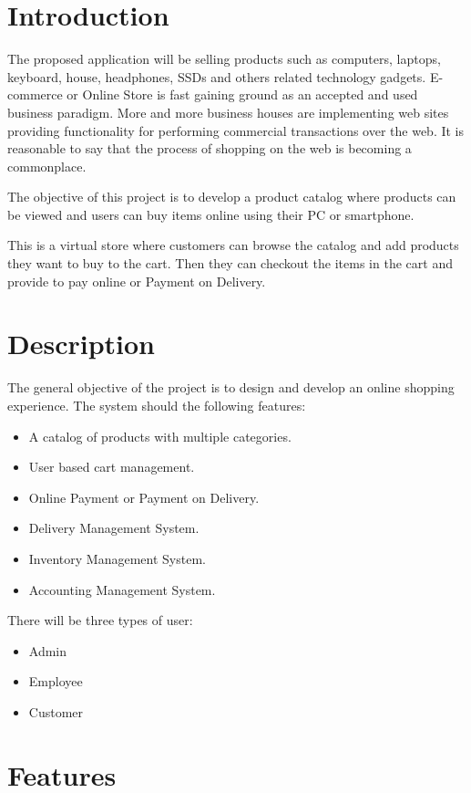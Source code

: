 \documentclass[12pt]{article}
\begin{document}
\section{Introduction}
The proposed application will be selling products such as computers, laptops, keyboard, house, headphones, SSDs and others related technology gadgets. E-commerce or Online Store is fast gaining ground as an accepted and used business paradigm. More and more business houses are implementing web sites providing functionality for performing commercial transactions over the web. It is reasonable to say that the process of shopping on the web is becoming a commonplace. \par
The objective of this project is to develop a product catalog where products can be viewed and users can buy items online using their PC or smartphone. \par
This is a virtual store where customers can browse the catalog and add products they want to buy to the cart. Then they can checkout the items in the cart and provide to pay online or Payment on Delivery.

\section{Description}
The general objective of the project is to design and develop an online shopping experience. The system should the following features: \par
\begin{itemize}
    \item A catalog of products with multiple categories.
    \item User based cart management.
    \item Online Payment or Payment on Delivery.
    \item Delivery Management System.
    \item Inventory Management System.
    \item Accounting Management System.
\end{itemize}
There will be three types of user: \par
\begin{itemize}
    \item Admin
    \item Employee
    \item Customer
\end{itemize}

\section{Features}
\end{document}
